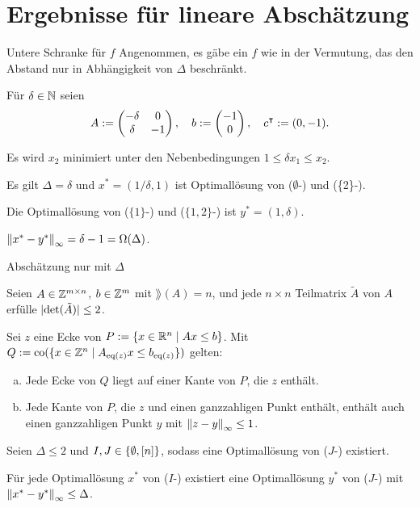 \section{Ergebnisse für lineare Abschätzung}

\begin{frame}{Untere Schranke für $f$}
	Angenommen, es gäbe ein $f$ wie in der Vermutung, das den Abstand nur in Abhängigkeit von $\Delta$ beschränkt.
	
	\renewcommand{\thisthmnumber}{3.1}
	\begin{beispiel}
	Für $\delta\in\mathbb{N}$ seien
	$$A:=
	\begin{pmatrix}
	-\delta & 0  \\
	\delta  & -1
	\end{pmatrix},\quad
	b:=\begin{pmatrix} -1 \\ 0 \end{pmatrix},\quad
	c^\intercal:=(0, -1).
	$$
	
	\pause
	Es wird $x_2$ minimiert unter den Nebenbedingungen $1\leq\delta x_1\leq x_2$.
	
	\pause
	Es gilt $\Delta=\delta$ und $x^*=(1/\delta,1)$ ist Optimallösung von ($\emptyset$-\MIPI) und (\{2\}-\MIPI).
	
	\pause
	Die Optimallösung von ($\{1\}$-\MIPI) und ($\{1, 2\}$-\MIPI) ist $y^*=(1,\delta)$.
	
	\pause
	$\left\lVert x^*-y^*\right\rVert_\infty=\delta-1=\Omega(\Delta)$.
	\end{beispiel}
\end{frame}

\begin{frame}{Abschätzung nur mit $\Delta$} 
	\renewcommand{\thisthmnumber}{3.3}
	\begin{lem}\label{lem:veselov}
		Seien $A\in\mathbb{Z}^{m\times n}$, $b\in\mathbb{Z}^m$ mit $\rang(A)=n$, und jede $n\times n$ Teilmatrix $\tilde{A}$ von $A$ erfülle $\lvert \det(\tilde{A}) \rvert\leq 2$.
		
		Sei $z$ eine Ecke von $P:=\{x\in\mathbb{R}^n\mid Ax\leq b \}$. Mit  $Q:=\operatorname{co}(\{x\in\mathbb{Z}^n \mid A_{\operatorname{eq}(z)}x \leq b_{\operatorname{eq}(z)} \})$
		gelten:
		\begin{enumerate}[(a)]
			\item Jede Ecke von $Q$ liegt auf einer Kante von $P$, die $z$ enthält.
			\item Jede Kante von $P$, die $z$ und einen ganzzahligen Punkt enthält, enthält auch einen ganzzahligen Punkt $y$ mit $\left\lVert z -y\right\rVert_\infty\leq 1$.
		\end{enumerate}
	\end{lem}
	\pause
	\renewcommand{\thisthmnumber}{3.9}
	\begin{thm}
		Seien $\Delta\leq 2$ und $I,J\in\{\emptyset,[n]\}$, sodass eine Optimallösung von ($J$-\MIPI) existiert.
		
		Für jede Optimallösung $x^*$ von ($I$-\MIPI) existiert eine Optimallösung $y^*$ von ($J$-\MIPI) mit $\left\lVert x^*-y^*\right\rVert_\infty\leq \Delta$.
	\end{thm}
\end{frame}